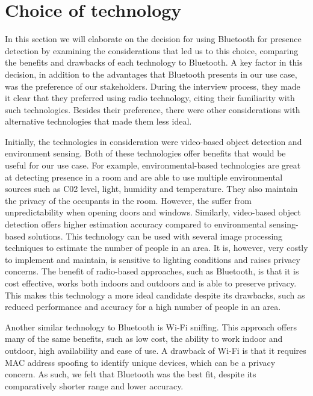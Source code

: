 \section{Choice of technology}
In this section we will elaborate on the decision for using Bluetooth for presence detection by examining the considerations that led us to this choice, comparing the benefits and drawbacks of each technology to Bluetooth.
A key factor in this decision, in addition to the advantages that Bluetooth presents in our use case, was the preference of our stakeholders. During the interview process, they made it clear that they preferred using radio technology, citing their familiarity with such technologies. 
Besides their preference, there were other considerations with alternative technologies that made them less ideal.

Initially, the technologies in consideration were video-based object detection and environment sensing. 
Both of these technologies offer benefits that would be useful for our use case. 
For example, environmental-based technologies are great at detecting presence in a room and are able to use multiple environmental sources such as C02 level, light, humidity and temperature. 
They also maintain the privacy of the occupants in the room. However, the suffer from unpredictability when opening doors and windows. 
Similarly, video-based object detection offers higher estimation accuracy compared to environmental sensing-based solutions. This technology can be used with several image processing techniques to estimate the number of people in an area. It is, however, very costly to implement and maintain, is sensitive to lighting conditions and raises privacy concerns.
The benefit of radio-based approaches, such as Bluetooth, is that it is cost effective, works both indoors and outdoors and is able to preserve privacy. This makes this technology a more ideal candidate despite its drawbacks, such as reduced performance and accuracy for a high number of people in an area. 

Another similar technology to Bluetooth is Wi-Fi sniffing. This approach offers many of the same benefits, such as low cost, the ability to work indoor and outdoor, high availability and ease of use. A drawback of Wi-Fi is that it requires MAC address spoofing to identify unique devices, which can be a privacy concern. As such, we felt that Bluetooth was the best fit, despite its comparatively shorter range and lower accuracy. \cite{longoAccurateOccupancyEstimation2019}


